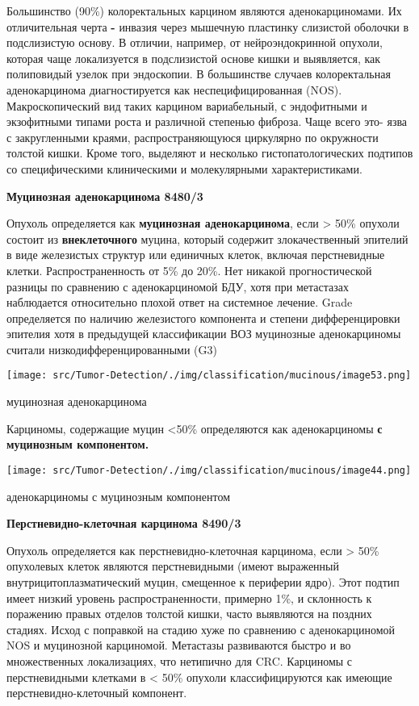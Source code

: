 \documentclass[
  russian,
  12pt,
  a4paper,
]{report}
\begin{document}
Большинство (90\%) колоректальных карцином являются аденокарциномами. Их
отличительная черта \textbf{-} инвазия через мышечную пластинку
слизистой оболочки в подслизистую основу. В отличии, например, от
нейроэндокринной опухоли, которая чаще локализуется в подслизистой
основе кишки и выявляется, как полиповидый узелок при эндоскопии. В
большинстве случаев колоректальная аденокарцинома диагностируется как
неспецифицированная (NOS). Макроскопический вид таких карцином
вариабельный, с эндофитными и экзофитными типами роста и различной
степенью фиброза. Чаще всего это- язва с закругленными краями,
распространяющуюся циркулярно по окружности толстой кишки. Кроме того,
выделяют и несколько гистопатологических подтипов со специфическими
клиническими и молекулярными характеристиками.

\textbf{Муцинозная аденокарцинома 8480/3}

Опухоль определяется как \textbf{муцинозная аденокарцинома}, если
\textgreater{} 50\% опухоли состоит из \textbf{внеклеточного} муцина,
который содержит злокачественный эпителий в виде железистых структур или
единичных клеток, включая перстневидные клетки. Распространенность от
5\% до 20\%. Нет никакой прогностической разницы по сравнению с
аденокарциномой БДУ, хотя при метастазах наблюдается относительно плохой
ответ на системное лечение. Grade определяется по наличию железистого
компонента и степени дифференцировки эпителия хотя в предыдущей
классификации ВОЗ муцинозные аденокарциномы считали
низкодифференцированными (G3)

\texttt{[image: src/Tumor-Detection/./img/classification/mucinous/image53.png]}

муцинозная аденокарцинома

Карциномы, содержащие муцин \textless50\% определяются как
аденокарциномы \textbf{с муцинозным компонентом.}

\texttt{[image: src/Tumor-Detection/./img/classification/mucinous/image44.png]}

аденокарциномы с муцинозным компонентом

\textbf{Перстневидно-клеточная карцинома 8490/3}

Опухоль определяется как перстневидно-клеточная карцинома, если
\textgreater{} 50\% опухолевых клеток являются перстневидными (имеют
выраженный внутрицитоплазматический муцин, смещенное к периферии ядро).
Этот подтип имеет низкий уровень распространенности, примерно 1\%, и
склонность к поражению правых отделов толстой кишки, часто выявляются на
поздних стадиях. Исход с поправкой на стадию хуже по сравнению с
аденокарциномой NOS и муцинозной карциномой. Метастазы развиваются
быстро и во множественных локализациях, что нетипично для CRC. Карциномы
с перстневидными клетками в \textless{} 50\% опухоли классифицируются
как имеющие перстневидно-клеточный компонент.
\end{document}
